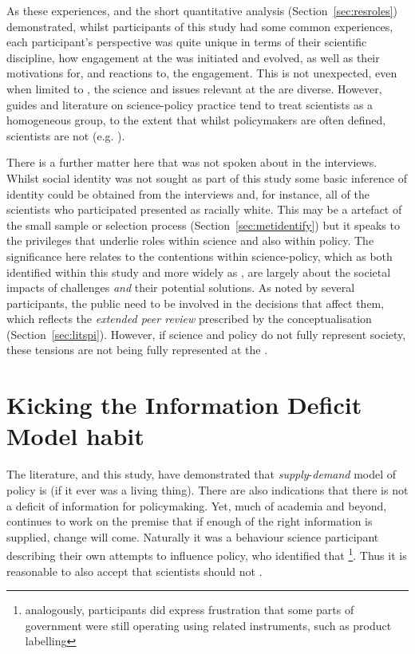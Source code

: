 As these experiences, and the short quantitative analysis (Section~\ref{sec:resroles}) demonstrated, whilst participants of this study had some common experiences, each participant's perspective was quite unique in terms of their scientific discipline, how engagement at the \SPI{} was initiated and evolved, as well as their motivations for, and reactions to, the engagement. This is not unexpected, even when limited to \CAN{}, the science and issues relevant at the \SPI{} are diverse. However, guides and literature on science-policy practice tend to treat scientists as a homogeneous group, to the extent that whilst policymakers are often defined, scientists are not (e.g. \cite{BA2024trust}). 

There is a further matter here that was not spoken about in the interviews. Whilst social identity was not sought as part of this study some basic inference of identity could be obtained from the interviews and, for instance, all of the scientists who participated presented as racially white. This may be a artefact of the small sample or selection process (Section~\ref{sec:metidentify}) but it speaks to the privileges that underlie roles within science and also within policy. The significance here relates to the contentions within \CAN{} science-policy, which as both identified within this study and more widely as \PNS, are largely about the societal impacts of \CAN{} challenges \emph{and} their potential solutions. As noted by several participants, the public need to be involved in the decisions that affect them, which reflects the \emph{extended peer review} prescribed by the \PNS{} conceptualisation (Section~\ref{sec:litspi}). However, if science and policy do not fully represent society, these tensions are not being fully represented at the \SPI{}. 

\section{Kicking the Information Deficit Model habit}\label{sec:disdeficit}

The literature, and this study, have demonstrated that \emph{supply}-\emph{demand} model of policy is  (if it ever was a living thing). There are also indications that there is not a deficit of information for \CAN{} policymaking. Yet, much of academia and beyond, continues to work on the \IDM{} premise that if enough of the right information is supplied, change will come. Naturally it was a behaviour science participant describing their own attempts to influence policy, who identified that \footnote{analogously, participants did express frustration that some parts of government were still operating using related instruments, such as product labelling}. Thus it is reasonable to also accept that scientists should not .


